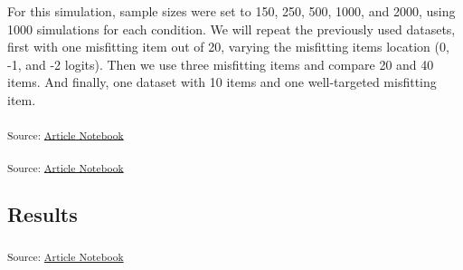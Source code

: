 \documentclass[
  letterpaper,
  DIV=11,
  numbers=noendperiod]{scrartcl}
\begin{document}
For this simulation, sample sizes were set to 150, 250, 500, 1000, and
2000, using 1000 simulations for each condition. We will repeat the
previously used datasets, first with one misfitting item out of 20,
varying the misfitting items location (0, -1, and -2 logits). Then we
use three misfitting items and compare 20 and 40 items. And finally, one
dataset with 10 items and one well-targeted misfitting item.

\textsubscript{Source:
\href{https://pgmj.github.io/rasch_itemfit/index.qmd.html}{Article
Notebook}}

\textsubscript{Source:
\href{https://pgmj.github.io/rasch_itemfit/index.qmd.html}{Article
Notebook}}

\subsection{Results}\label{results-4}

\textsubscript{Source:
\href{https://pgmj.github.io/rasch_itemfit/index.qmd.html}{Article
Notebook}}
\end{document}
